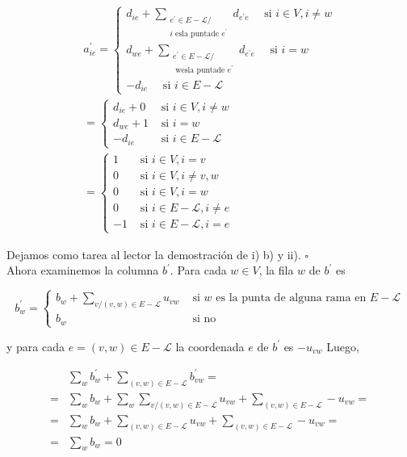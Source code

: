 \documentclass[10pt]{article}
\begin{document}
$$
\begin{gathered}
a_{i e}^{\prime}=\left\{\begin{array}{l}
d_{i e}+\sum_{\substack{e^{\prime} \in E-\mathcal{L} / \\
i \text { esla puntade } e^{\prime}}} d_{e^{\prime} e} \quad \text { si } i \in V, i \neq w \\
d_{w e}+\sum_{\substack{e^{\prime} \in E-\mathcal{L} / \\
\text { wesla puntade } e^{\prime}}} d_{e^{\prime} e} \quad \text { si } i=w \\
-d_{i e} \quad \text { si } i \in E-\mathcal{L}
\end{array}\right. \\
= \begin{cases}d_{i e}+0 & \text { si } i \in V, i \neq w \\
d_{w e}+1 & \text { si } i=w \\
-d_{i e} & \text { si } i \in E-\mathcal{L}\end{cases} \\
= \begin{cases}1 & \text { si } i \in V, i=v \\
0 & \text { si } i \in V, i \neq v, w \\
0 & \text { si } i \in V, i=w \\
0 & \text { si } i \in E-\mathcal{L}, i \neq e \\
-1 & \text { si } i \in E-\mathcal{L}, i=e\end{cases}
\end{gathered}
$$

Dejamos como tarea al lector la demostración de i) b) y ii). $\square$\\
Ahora examinemos la columna $b^{\prime}$. Para cada $w \in V$, la fila $w$ de $b^{\prime}$ es

$$
b_{w}^{\prime}= \begin{cases}b_{w}+\sum_{v /(v, w) \in E-\mathcal{L}} u_{v w} & \text { si } w \text { es la punta de alguna rama en } E-\mathcal{L} \\ b_{w} & \text { si no }\end{cases}
$$

y para cada $e=(v, w) \in E-\mathcal{L}$ la coordenada $e$ de $b^{\prime}$ es $-u_{v w}$ Luego,

$$
\begin{aligned}
& \sum_{w} b_{w}^{\prime}+\sum_{(v, w) \in E-\mathcal{L}} b_{v w}^{\prime}= \\
= & \sum_{w} b_{w}+\sum_{w} \sum_{v /(v, w) \in E-\mathcal{L}} u_{v w}+\sum_{(v, w) \in E-\mathcal{L}}-u_{v w}= \\
= & \sum_{w} b_{w}+\sum_{(v, w) \in E-\mathcal{L}} u_{v w}+\sum_{(v, w) \in E-\mathcal{L}}-u_{v w}= \\
= & \sum_{w} b_{w}=0
\end{aligned}
$$
\end{document}
